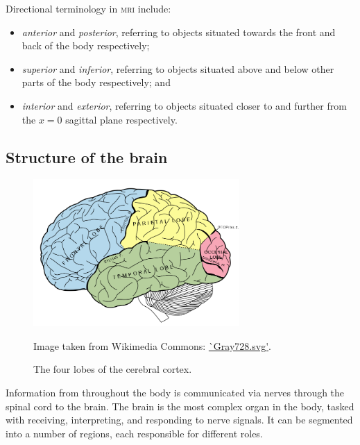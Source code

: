 Directional terminology in \textsc{mri} include:
\begin{itemize}
	\item \textit{anterior} and \textit{posterior}, referring to objects situated towards the front and back of the body respectively;
	\item \textit{superior} and \textit{inferior}, referring to objects situated above and below other parts of the body respectively; and
	\item \textit{interior} and \textit{exterior}, referring to objects situated closer to and further from the $x=0$ sagittal plane respectively.
\end{itemize}

\subsection*{Structure of the brain}\label{svd-brain}

\begin{figure}[ht]
	\centering
	\includegraphics[width=0.7\textwidth]{Images/2_Lobes_of_the_brain_NL.png}
	\caption{The four lobes of the cerebral cortex.}
	\small Image taken from Wikimedia Commons: \url{`Gray728.svg'}.
	\label{svd-cerebrumfig}
\end{figure}

Information from throughout the body is communicated via nerves through the spinal cord to the brain. The brain is the most complex organ in the body, tasked with receiving, interpreting, and responding to nerve signals. It can be segmented into a number of regions, each responsible for different roles.

